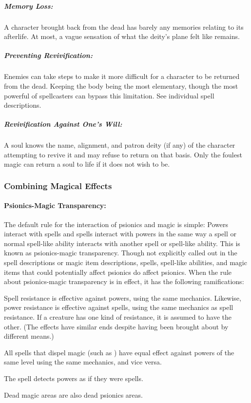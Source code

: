 \subparagraph{Memory Loss:} A character brought back from the dead has barely any memories relating to its afterlife. At most, a vague sensation of what the deity's plane felt like remains.

\subparagraph{Preventing Revivification:} 
Enemies can take steps to make it more difficult for a character to be returned from the dead. 
Keeping the body being the most elementary, though the most powerful of spellcasters can bypass this limitation. 
See individual spell descriptions.

\subparagraph{Revivification Against One's Will:} 
A soul knows the name, alignment, and patron deity (if any) of the character attempting to revive it and may refuse to return on that basis.
Only the foulest magic can return a soul to life if it does not wish to be.
\subsubsection{Combining Magical Effects}
\label{sec:CombiningMagicalEffects}
\paragraph{Psionics-Magic Transparency:} The default rule for the interaction of psionics and magic is simple: 
Powers interact with spells and spells interact with powers in the same way a spell or normal spell-like ability interacts with another spell or spell-like ability. 
This is known as psionics-magic transparency.
Though not explicitly called out in the spell descriptions or magic item descriptions, spells, spell-like abilities, and magic items that could potentially affect psionics do affect psionics. 
When the rule about psionics-magic transparency is in effect, it has the following ramifications:
\begin{list}{}{\leftmargin=1em}
\item Spell resistance is effective against powers, using the same mechanics. 
Likewise, power resistance is effective against spells, using the same mechanics as spell resistance. 
If a creature has one kind of resistance, it is assumed to have the other. (The effects have similar ends despite having been brought about by different means.)
\item All spells that dispel magic (such as ) have equal effect against powers of the same level using the same mechanics, and vice versa.
\item The spell  detects powers as if they were spells.
\item Dead magic areas are also dead psionics areas.
\end{list}
